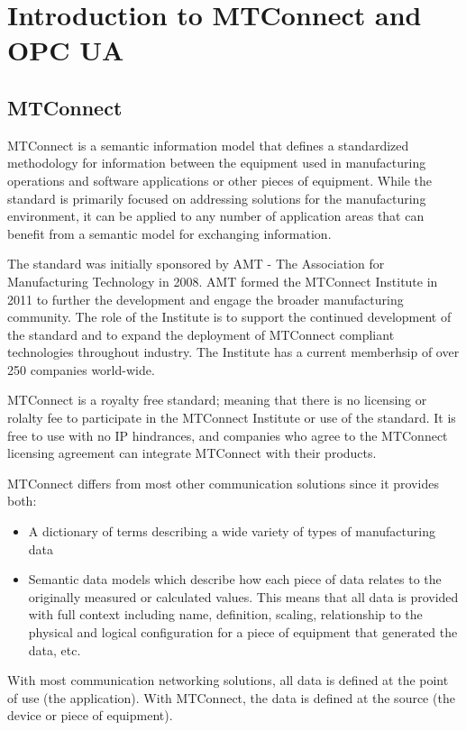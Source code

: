 \section{Introduction to MTConnect and OPC UA}

\subsection{MTConnect}

MTConnect is a semantic information model that defines a standardized methodology for information between the equipment used in manufacturing operations and software applications or other pieces of equipment. While the standard is primarily focused on addressing solutions for the manufacturing environment, it can be applied to any number of application areas that can benefit from a semantic model for exchanging information. 
   
The standard was initially sponsored by AMT - The Association for Manufacturing Technology in 2008.  AMT formed the MTConnect Institute in 2011 to further the development and engage the broader manufacturing community. The role of the Institute is to support the continued development of the standard and to expand the deployment of MTConnect compliant technologies throughout industry. The Institute has a current memberhsip of over 250 companies world-wide.  

MTConnect is a royalty free standard; meaning that there is no licensing or rolalty fee to participate in the MTConnect Institute or use of the standard.  It is free to use with no IP hindrances, and companies who agree to the MTConnect licensing agreement can integrate MTConnect with their products. 

MTConnect differs from most other communication solutions since it provides both:
\begin{itemize}
    \item A dictionary of terms describing a wide variety of types of manufacturing data
    \item Semantic data models which describe how each piece of data relates to the originally measured or calculated values. This means that all data is provided with full context including name, definition, scaling, relationship to the physical and logical configuration for a piece of equipment that generated the data, etc.
\end{itemize}

With most communication networking solutions, all data is defined at the point of use (the application).  With MTConnect, the data is defined at the source (the device or piece of equipment). 


